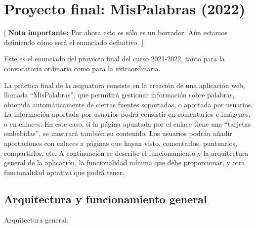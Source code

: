 \section{Proyecto final: MisPalabras (2022)}
\label{practica-final-2022-05}

[ \textbf{Nota importante:} Por ahora esto es sólo es un borrador. Aún estamos definiendo cómo será el enunciado definitivo. ]

Este es el enunciado del proyecto final del curso 2021-2022, tanto para la convocatoria ordinaria como para la extraordinaria.

La práctica final de la asignatura consiste en la creación de una aplicación web, llamada ``MisPalabras'', que permitirá gestionar información sobre palabras, obtenida automáticamente de ciertas fuentes soportadas, o aportada por usuarios. La información aportada por usuarios podrá consistir en comentarios e imágenes, o en enlaces. En este caso, si la página apuntada por el enlace tiene una ``tarjetas embebidas'', se mostrará también su contenido. Los usuarios podrán añadir aportaciones con enlaces a páginas que hayan visto, comentarlos, puntuarlos, compartirlos, etc. A continuación se describe el funcionamiento y la arquitectura general de la aplicación, la funcionalidad mínima que debe proporcionar, y otra funcionalidad optativa que podrá tener.

\subsection{Arquitectura y funcionamiento general}

Arquitectura general:

